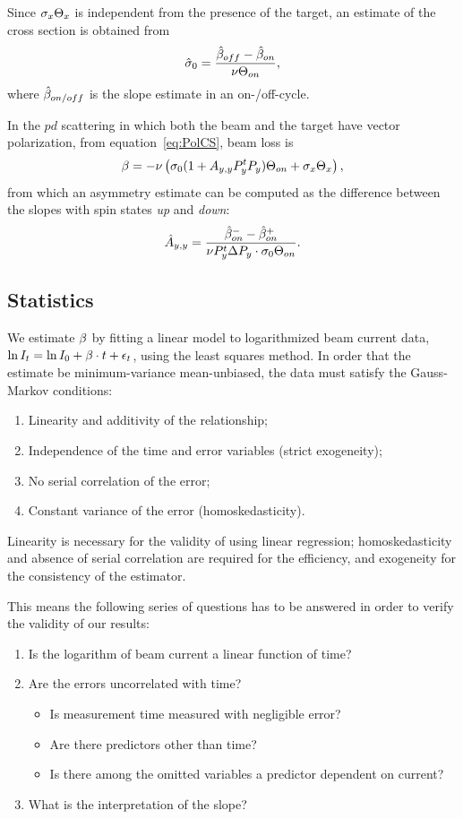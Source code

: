 \documentclass[reprint, superscriptaddress]{revtex4-1}
\begin{document}
Since $\CS[x]\Thick[x]$ is independent from the presence of the target, an estimate of the cross section is obtained from  
\begin{equation}
	\CS*[0] = \frac{\slp*[off] - \slp*[on]}{\nu\Thick[on]},
\end{equation}
where $\slp*[on/off]$ is the slope estimate in an on-/off-cycle.

In the $pd$ scattering in which both the beam and the target have vector polarization, from equation~\eqref{eq:PolCS}, beam loss is
\[
	\slp = -\nu\bkt{\CS[0](1 + \Ayy P_y^t P_y)\Thick[on] + \CS[x]\Thick[x]},
\]
from which an asymmetry estimate can be computed as the difference between the slopes with spin states \emph{up} and \emph{down}:
\begin{equation}\label{eq:AyyEst}
	\Ayy* = \frac{\slp*[on]^- - \slp*[on]^+}{\nu P_y^t\Delta P_y\cdot \CS[0]\Thick[on]}.
\end{equation}

\subsection{Statistics}

We estimate $\slp$ by fitting a linear model to logarithmized beam current data, $\ln I_t = \ln I_0 + \slp\cdot t + \epsilon_t$, using the least squares method. In order that the estimate be minimum-variance mean-unbiased, the data must satisfy the Gauss-Markov conditions: %
\begin{enumerate}
	\item Linearity and additivity of the relationship;
	\item Independence of the time and error variables (strict exogeneity);
	\item No serial correlation of the error;
	\item Constant variance of the error (homoskedasticity).
\end{enumerate}

Linearity is necessary for the validity of using linear regression; homoskedasticity and absence of serial correlation are required for the efficiency, and exogeneity for the consistency of the estimator.

This means the following series of questions has to be answered in order to verify the validity of our results:
\begin{enumerate}
	\item Is the logarithm of beam current a linear function of time?
	\item Are the errors uncorrelated with time?
		\begin{itemize}
			\item Is measurement time measured with negligible error?
			\item Are there predictors other than time?
			\item Is there among the omitted variables a predictor dependent on current?
		\end{itemize}
	\item What is the interpretation of the slope?
\end{enumerate}
\end{document}

